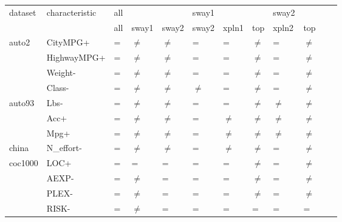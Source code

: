 \begin{tabular}{llllllllllll}
  \hline
  dataset & characteristic & all & & &   
                             sway1 & & & 
                             sway2 & & &  \\
  & & all & sway1 & sway2 & 
  sway2 & xpln1 & top & 
  xpln2 & top & \\
  \hline\hline
  auto2     & CityMPG+ & = & $\neq$ & $\neq$ &  
                         = & = & $\neq$ & 
                         = & $\neq$ & \\
            & HighwayMPG+ & = & $\neq$ & $\neq$ & 
                            = & = & $\neq$ & 
                            = & $\neq$ & \\
            & Weight- & = & $\neq$ & $\neq$ & 
                        = & = & $\neq$ & 
                        = & $\neq$ & \\
            & Class-  & = & $\neq$ & $\neq$ & 
                        $\neq$ & = & $\neq$ & 
                        = & $\neq$ & 
                        \\
  \hline
  auto93    & Lbs-  & = & $\neq$ & $\neq$ & 
                      = & =  & $\neq$ & 
                      $\neq$ & $\neq$ &  \\
            & Acc+  & = & $\neq$ & $\neq$ & 
                      = & $\neq$  & $\neq$ & 
                       $\neq$ & $\neq$ & 
                       \\
            & Mpg+  & = & $\neq$ & $\neq$ & 
                      = & $\neq$ & $\neq$ & 
                       $\neq$ & $\neq$ & 
                       \\
  \hline
  china     & N\_effort- & = & $\neq$ & $\neq$ &
                           = & $\neq$ & $\neq$ & 
                           = & $\neq$ & 
                           \\
  \hline
  coc1000   & LOC+   & = & = & = & 
                       = & = & $\neq$ & 
                       = & $\neq$ & 
                        \\
            & AEXP-  & = & $\neq$ & = & 
                       = & = & $\neq$ & 
                        = & $\neq$ & 
                        \\
            & PLEX-  & = & $\neq$ & = & 
                       = & = & $\neq$ & 
                       = & $\neq$ & 
                        \\
            & RISK-  & = & $\neq$ & = & 
                       = & =  & = & 
                       = & = & 
                        \\

\end{tabular}

